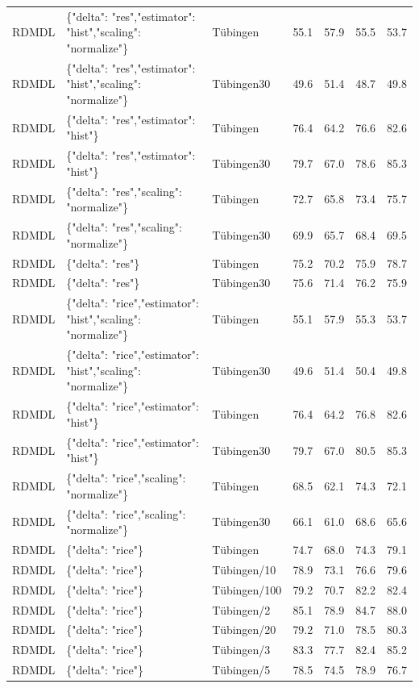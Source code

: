 \begin{tabular}{lllllll}
RDMDL & \{"delta": "res","estimator": "hist","scaling": "normalize"\} & Tübingen & 55.1 & 57.9 & 55.5 & 53.7 \\
RDMDL & \{"delta": "res","estimator": "hist","scaling": "normalize"\} & Tübingen30 & 49.6 & 51.4 & 48.7 & 49.8 \\
RDMDL & \{"delta": "res","estimator": "hist"\} & Tübingen & 76.4 & 64.2 & 76.6 & 82.6 \\
RDMDL & \{"delta": "res","estimator": "hist"\} & Tübingen30 & 79.7 & 67.0 & 78.6 & 85.3 \\
RDMDL & \{"delta": "res","scaling": "normalize"\} & Tübingen & 72.7 & 65.8 & 73.4 & 75.7 \\
RDMDL & \{"delta": "res","scaling": "normalize"\} & Tübingen30 & 69.9 & 65.7 & 68.4 & 69.5 \\
RDMDL & \{"delta": "res"\} & Tübingen & 75.2 & 70.2 & 75.9 & 78.7 \\
RDMDL & \{"delta": "res"\} & Tübingen30 & 75.6 & 71.4 & 76.2 & 75.9 \\
RDMDL & \{"delta": "rice","estimator": "hist","scaling": "normalize"\} & Tübingen & 55.1 & 57.9 & 55.3 & 53.7 \\
RDMDL & \{"delta": "rice","estimator": "hist","scaling": "normalize"\} & Tübingen30 & 49.6 & 51.4 & 50.4 & 49.8 \\
RDMDL & \{"delta": "rice","estimator": "hist"\} & Tübingen & 76.4 & 64.2 & 76.8 & 82.6 \\
RDMDL & \{"delta": "rice","estimator": "hist"\} & Tübingen30 & 79.7 & 67.0 & 80.5 & 85.3 \\
RDMDL & \{"delta": "rice","scaling": "normalize"\} & Tübingen & 68.5 & 62.1 & 74.3 & 72.1 \\
RDMDL & \{"delta": "rice","scaling": "normalize"\} & Tübingen30 & 66.1 & 61.0 & 68.6 & 65.6 \\
RDMDL & \{"delta": "rice"\} & Tübingen & 74.7 & 68.0 & 74.3 & 79.1 \\
RDMDL & \{"delta": "rice"\} & Tübingen/10 & 78.9 & 73.1 & 76.6 & 79.6 \\
RDMDL & \{"delta": "rice"\} & Tübingen/100 & 79.2 & 70.7 & 82.2 & 82.4 \\
RDMDL & \{"delta": "rice"\} & Tübingen/2 & 85.1 & 78.9 & 84.7 & 88.0 \\
RDMDL & \{"delta": "rice"\} & Tübingen/20 & 79.2 & 71.0 & 78.5 & 80.3 \\
RDMDL & \{"delta": "rice"\} & Tübingen/3 & 83.3 & 77.7 & 82.4 & 85.2 \\
RDMDL & \{"delta": "rice"\} & Tübingen/5 & 78.5 & 74.5 & 78.9 & 76.7 \\

\end{tabular}
